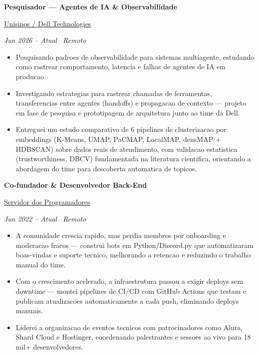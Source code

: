 \documentclass[10.5pt]{article}
\newcommand\orgline[1]{{\color{acc}\underline{#1}}\par\vspace{1pt}}
\newcommand\datesline[1]{{\color{textgray}\itshape\fontsize{8.7pt}{10.5pt}\selectfont #1}\par\vspace{3pt}}
\newenvironment{bullets}{%
  \begin{itemize}[leftmargin=4.2mm,label={\color{acc}\fontsize{8pt}{8pt}\selectfont --},itemsep=3pt,topsep=1pt,parsep=0pt]
}{\end{itemize}\vspace{2pt}}
\begin{document}
{\bfseries\fontsize{10.5pt}{13pt}\selectfont Pesquisador --- Agentes de IA \& Observabilidade}\par\vspace{1pt}
\orgline{Unisinos / Dell Technologies}
\datesline{Jun 2026 -- Atual \textperiodcentered\ Remoto}
\begin{bullets}
  \item\fontsize{9.5pt}{13.5pt}\selectfont Pesquisando padroes de observabilidade para sistemas multiagente, estudando como rastrear comportamento, latencia e falhas de agentes de IA em producao.
  \item\fontsize{9.5pt}{13.5pt}\selectfont Investigando estrategias para rastrear chamadas de ferramentas, transferencias entre agentes (handoffs) e propagacao de contexto --- projeto em fase de pesquisa e prototipagem de arquitetura junto ao time da Dell.
  \item\fontsize{9.5pt}{13.5pt}\selectfont Entreguei um estudo comparativo de 6 pipelines de clusterizacao por embeddings (K-Means, UMAP, PaCMAP, LocalMAP, densMAP + HDBSCAN) sobre dados reais de atendimento, com validacao estatistica (trustworthiness, DBCV) fundamentada na literatura cientifica, orientando a abordagem do time para descoberta automatica de topicos.
\end{bullets}

{\bfseries\fontsize{10.5pt}{13pt}\selectfont Co-fundador \& Desenvolvedor Back-End}\par\vspace{1pt}
\orgline{Servidor dos Programadores}
\datesline{Jun 2022 -- Atual \textperiodcentered\ Remoto}
\begin{bullets}
  \item\fontsize{9.5pt}{13.5pt}\selectfont A comunidade crescia rapido, mas perdia membros por onboarding e moderacao fracos --- construi bots em Python/Discord.py que automatizaram boas-vindas e suporte tecnico, melhorando a retencao e reduzindo o trabalho manual do time.
  \item\fontsize{9.5pt}{13.5pt}\selectfont Com o crescimento acelerado, a infraestrutura passou a exigir deploys sem downtime --- montei pipelines de CI/CD com GitHub Actions que testam e publicam atualizacoes automaticamente a cada push, eliminando deploys manuais.
  \item\fontsize{9.5pt}{13.5pt}\selectfont Liderei a organizacao de eventos tecnicos com patrocinadores como Alura, Shard Cloud e Hostinger, coordenando palestrantes e sessoes ao vivo para 18 mil+ desenvolvedores.
\end{bullets}
\end{document}
